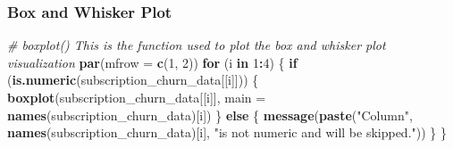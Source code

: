 \documentclass[
]{article}
\newenvironment{Shaded}{\begin{snugshade}}{\end{snugshade}}
\newcommand{\AttributeTok}[1]{\textcolor[rgb]{0.13,0.29,0.53}{#1}}
\newcommand{\CommentTok}[1]{\textcolor[rgb]{0.56,0.35,0.01}{\textit{#1}}}
\newcommand{\ControlFlowTok}[1]{\textcolor[rgb]{0.13,0.29,0.53}{\textbf{#1}}}
\newcommand{\DecValTok}[1]{\textcolor[rgb]{0.00,0.00,0.81}{#1}}
\newcommand{\FunctionTok}[1]{\textcolor[rgb]{0.13,0.29,0.53}{\textbf{#1}}}
\newcommand{\NormalTok}[1]{#1}
\newcommand{\SpecialCharTok}[1]{\textcolor[rgb]{0.81,0.36,0.00}{\textbf{#1}}}
\newcommand{\StringTok}[1]{\textcolor[rgb]{0.31,0.60,0.02}{#1}}
\begin{document}
\subsubsection{Box and Whisker Plot}\label{box-and-whisker-plot}

\begin{Shaded}
\begin{Highlighting}[]
\CommentTok{\# \textasciigrave{}boxplot()\textasciigrave{} This is the function used to plot the box and whisker plot visualization}
\FunctionTok{par}\NormalTok{(}\AttributeTok{mfrow =} \FunctionTok{c}\NormalTok{(}\DecValTok{1}\NormalTok{, }\DecValTok{2}\NormalTok{))}
\ControlFlowTok{for}\NormalTok{ (i }\ControlFlowTok{in} \DecValTok{1}\SpecialCharTok{:}\DecValTok{4}\NormalTok{) \{}
  \ControlFlowTok{if}\NormalTok{ (}\FunctionTok{is.numeric}\NormalTok{(subscription\_churn\_data[[i]])) \{}
    \FunctionTok{boxplot}\NormalTok{(subscription\_churn\_data[[i]], }\AttributeTok{main =} \FunctionTok{names}\NormalTok{(subscription\_churn\_data)[i])}
\NormalTok{  \} }\ControlFlowTok{else}\NormalTok{ \{}
    \FunctionTok{message}\NormalTok{(}\FunctionTok{paste}\NormalTok{(}\StringTok{"Column"}\NormalTok{, }\FunctionTok{names}\NormalTok{(subscription\_churn\_data)[i],}
                  \StringTok{"is not numeric and will be skipped."}\NormalTok{))}
\NormalTok{  \}}
\NormalTok{\}}
\end{Highlighting}
\end{Shaded}
\end{document}
